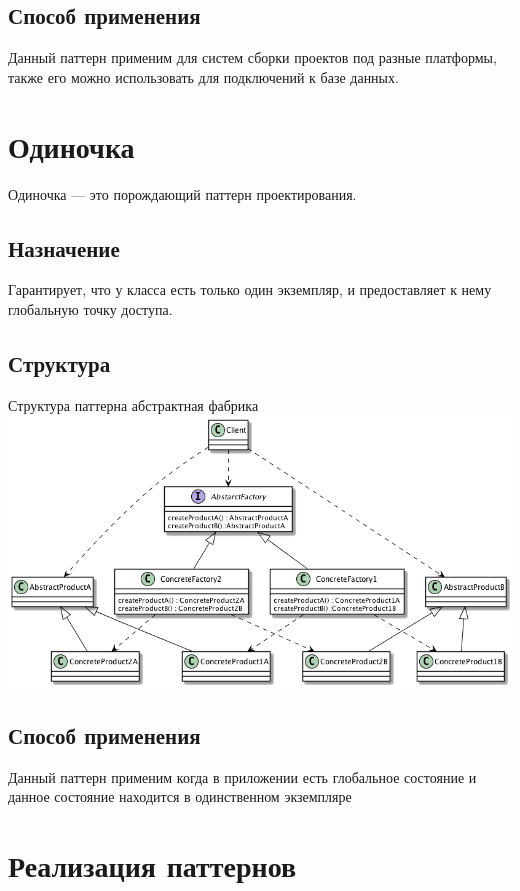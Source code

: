 \documentclass[PI,LAB]{HSEUniversity}
\begin{document}
\section{Способ применения}
Данный паттерн применим для систем сборки проектов под разные платформы, также его можно использовать для подключений к базе данных.
\chapter{Одиночка}
Одиночка — это порождающий паттерн проектирования.
\section{Назначение}
Гарантирует, что у класса есть только один экземпляр, и предоставляет к нему глобальную точку доступа.
\section{Структура}

\begin{FIGURE}[h]{Структура паттерна абстрактная фабрика\label{fig:example-figure}}
	\includegraphics[width=\textwidth]{out/diagrams/factory/flex}
\end{FIGURE}

\section{Способ применения}
Данный паттерн применим когда в приложении есть глобальное состояние и данное состояние находится в одинственном экземпляре
\chapter{Реализация паттернов}
\end{document}
